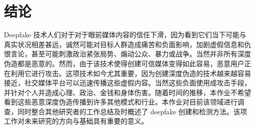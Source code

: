 \chapter{结论}
\label{chap:5}

Deepfake 技术人们对于对于眼前媒体内容的信任下滑，因为看到它们当下可能与真实状况相差甚远，诚然可能对目标人群造成痛苦和负面影响，加剧虚假信息和仇恨言论，甚至可能刺激政治紧张局势、煽动公众、暴力或战争。当然并非所有深度伪造都是恶意的。然而，由于该技术使得创建可信媒体变得如此容易，恶意用户正在利用它进行攻击。这项技术如今尤其重要，因为创建深度伪造的技术越来越容易接近，社交媒体平台可以迅速传播这些虚假内容。当然这些负面使用成攻击手段，并针对个人并造成心理、政治、金钱和身体伤害。随着时间的推移，本作业不希望看到这些恶意深度伪造传播到许多其他模式和行业。本作业对目前该领域进行调查，同时整合其他研究者的工作总结及时概述了 deepfake 创建和检测方法。该项工作对未来研究的方向与基础具有重要的意义。
